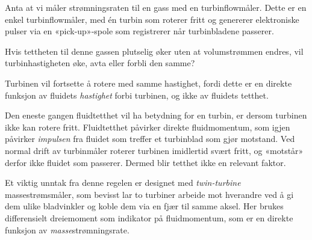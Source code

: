 

Anta at vi måler strømningsraten til en gass med en turbinflowmåler. Dette er en enkel turbinflowmåler, med én turbin som roterer fritt og genererer elektroniske pulser via en «pick-up»-spole som registrerer når turbinbladene passerer.

\vskip 10pt

Hvis tettheten til denne gassen plutselig øker uten at volumstrømmen endres, vil turbinhastigheten øke, avta eller forbli den samme?














Turbinen vil fortsette å rotere med samme hastighet, fordi dette er en direkte funksjon av fluidets {\it hastighet} forbi turbinen, og ikke av fluidets tetthet.

\vskip 10pt

Den eneste gangen fluidtetthet vil ha betydning for en turbin, er dersom turbinen ikke kan rotere fritt. Fluidtetthet påvirker direkte fluidmomentum, som igjen påvirker {\it impulsen} fra fluidet som treffer et turbinblad som gjør motstand. Ved normal drift av turbinmåler roterer turbinen imidlertid svært fritt, og «motstår» derfor ikke fluidet som passerer. Dermed blir tetthet ikke en relevant faktor.

Et viktig unntak fra denne regelen er designet med {\it twin-turbine} massestrømsmåler, som bevisst lar to turbiner arbeide mot hverandre ved å gi dem ulike bladvinkler og koble dem via en fjær til samme aksel. Her brukes differensielt dreiemoment som indikator på fluidmomentum, som er en direkte funksjon av {\it masse}strømningsrate.




